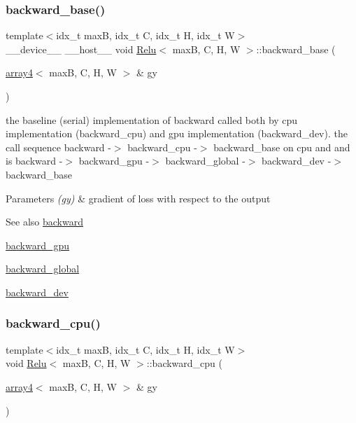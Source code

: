 \subsubsection{\texorpdfstring{backward\+\_\+base()}{backward\_base()}}
{\footnotesize\ttfamily template$<$idx\+\_\+t maxB, idx\+\_\+t C, idx\+\_\+t H, idx\+\_\+t W$>$ \\
\+\_\+\+\_\+device\+\_\+\+\_\+ \+\_\+\+\_\+host\+\_\+\+\_\+ void \hyperlink{structRelu}{Relu}$<$ maxB, C, H, W $>$\+::backward\+\_\+base (\begin{DoxyParamCaption}\item[{\hyperlink{structarray4}{array4}$<$ maxB, C, H, W $>$ \&}]{gy }\end{DoxyParamCaption})\hspace{0.3cm}{\ttfamily [inline]}}



the baseline (serial) implementation of backward called both by cpu implementation (backward\+\_\+cpu) and gpu implementation (backward\+\_\+dev). the call sequence backward -\/$>$ backward\+\_\+cpu -\/$>$ backward\+\_\+base on cpu and and is backward -\/$>$ backward\+\_\+gpu -\/$>$ backward\+\_\+global -\/$>$ backward\+\_\+dev -\/$>$ backward\+\_\+base 


\begin{DoxyParams}{Parameters}
{\em (gy)} & gradient of loss with respect to the output \\
\hline
\end{DoxyParams}
\begin{DoxySeeAlso}{See also}
\hyperlink{structRelu_af9d3182c5103542c1c9796edc449847c}{backward} 

\hyperlink{structRelu_a15ee109a34e8ad3c94c0b42c05647342}{backward\+\_\+gpu} 

\hyperlink{softmaxcrossentropy_8h_a47d56a9a23e08247b227f4aac17413e0}{backward\+\_\+global} 

\hyperlink{structRelu_a0b13992d8093aa08ed9036cac3a5437b}{backward\+\_\+dev} 
\end{DoxySeeAlso}
\mbox{\label{structRelu_aa2112a7ad1cb1faea9babc90835a84c5}} 
\subsubsection{\texorpdfstring{backward\+\_\+cpu()}{backward\_cpu()}}
{\footnotesize\ttfamily template$<$idx\+\_\+t maxB, idx\+\_\+t C, idx\+\_\+t H, idx\+\_\+t W$>$ \\
void \hyperlink{structRelu}{Relu}$<$ maxB, C, H, W $>$\+::backward\+\_\+cpu (\begin{DoxyParamCaption}\item[{\hyperlink{structarray4}{array4}$<$ maxB, C, H, W $>$ \&}]{gy }\end{DoxyParamCaption})\hspace{0.3cm}{\ttfamily [inline]}}



